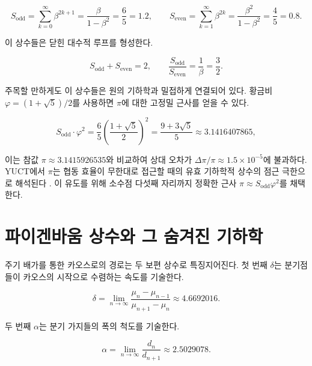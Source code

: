 \documentclass[11pt,a4paper]{article}
\begin{document}
	\begin{equation}
		S_{\mathrm{odd}} = \sum_{k=0}^{\infty} \beta^{2k+1} = \frac{\beta}{1-\beta^2} = \frac{6}{5} = 1.2, \qquad
		S_{\mathrm{even}} = \sum_{k=1}^{\infty} \beta^{2k} = \frac{\beta^2}{1-\beta^2} = \frac{4}{5} = 0.8.
	\end{equation}
	
	이 상수들은 닫힌 대수적 루프를 형성한다.
	
	\begin{equation}
		S_{\mathrm{odd}} + S_{\mathrm{even}} = 2, \qquad \frac{S_{\mathrm{odd}}}{S_{\mathrm{even}}} = \frac{1}{\beta} = \frac{3}{2}.
	\end{equation}
	
	주목할 만하게도 이 상수들은 원의 기하학과 밀접하게 연결되어 있다. 황금비 \(\varphi = (1+\sqrt{5})/2\)를 사용하면 \(\pi\)에 대한 고정밀 근사를 얻을 수 있다.
	
	\begin{equation}
		S_{\mathrm{odd}} \cdot \varphi^2 = \frac{6}{5} \left( \frac{1+\sqrt{5}}{2} \right)^2 = \frac{9+3\sqrt{5}}{5} \approx 3.1416407865,
	\end{equation}
	
	이는 참값 \(\pi \approx 3.1415926535\)와 비교하여 상대 오차가 \(\Delta\pi/\pi \approx 1.5 \times 10^{-5}\)에 불과하다. YUCT에서 \(\pi\)는 협동 효율이 무한대로 접근할 때의 유효 기하학적 상수의 점근 극한으로 해석된다 \cite{AppendixEhrenfest}. 이 유도를 위해 소수점 다섯째 자리까지 정확한 근사 \(\pi \approx S_{\mathrm{odd}}\varphi^2\)를 채택한다.
	
	\section{파이겐바움 상수와 그 숨겨진 기하학}
	
	주기 배가를 통한 카오스로의 경로는 두 보편 상수로 특징지어진다. 첫 번째 \(\delta\)는 분기점들이 카오스의 시작으로 수렴하는 속도를 기술한다.
	
	\begin{equation}
		\delta = \lim_{n\to\infty} \frac{\mu_n - \mu_{n-1}}{\mu_{n+1} - \mu_n} \approx 4.6692016.
	\end{equation}
	
	두 번째 \(\alpha\)는 분기 가지들의 폭의 척도를 기술한다.
	
	\begin{equation}
		\alpha = \lim_{n\to\infty} \frac{d_n}{d_{n+1}} \approx 2.5029078.
	\end{equation}
	
\end{document}
